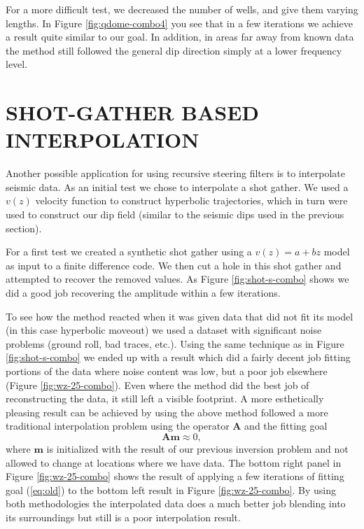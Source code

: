 
\par
For a more difficult test, we decreased the number of wells, and give
them varying lengths.
In Figure \ref{fig:qdome-combo4} you see that in a few iterations
we  achieve a result quite similar
to our goal. In addition, in areas far away from known data the method
still followed the general dip direction simply at a lower frequency level.




\section{SHOT-GATHER BASED INTERPOLATION}
Another possible application for using recursive
steering filters is to interpolate
seismic data.  As an initial test 
we chose to interpolate 
a shot gather.  We used a $v(z)$ velocity function to construct
hyperbolic trajectories, which in turn were used to
construct our dip
field (similar to the seismic dips used in the previous section).
\par
For a first test
we created a synthetic shot gather using a $v(z)=a+bz$ model as input
to a finite difference code.  We then cut
a hole in this shot gather  and attempted
to recover the removed values.
As Figure \ref{fig:shot-s-combo} shows we did a good job 
recovering the amplitude within a few iterations.

\par
To see how the method reacted when it was given data that did not
fit its model (in this case hyperbolic moveout) we used a dataset with
significant noise problems (ground roll, bad traces, etc.).  Using
the same technique as in Figure \ref{fig:shot-s-combo} 
we ended up with a result which did a fairly
decent job fitting portions of the data where noise content was low,
but a poor job elsewhere (Figure \ref{fig:wz-25-combo}).  Even  where
the method did the best job of reconstructing the data, it still left
a visible footprint. A more esthetically pleasing result can be achieved
by using the above method followed a more traditional interpolation problem
using  the operator $\mathbf A$ and the fitting goal
\begin{equation}
\mathbf A \mathbf m \approx 0 ,
\label{eq:old}
\end{equation}
where  $\mathbf m$ is initialized with the result of our previous 
inversion problem and not allowed to change at locations where we have data.
The bottom right panel in Figure \ref{fig:wz-25-combo}  shows
the result of applying a few iterations of fitting goal (\ref{eq:old}) 
to the bottom left result in Figure \ref{fig:wz-25-combo}.
By using  both methodologies the interpolated data does a much better job 
blending into its
surroundings but still is a poor interpolation result.


